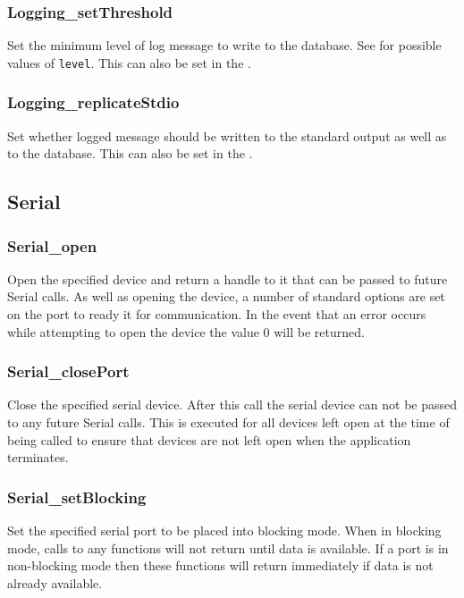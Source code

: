 \subsubsection{Logging\_setThreshold} \label{apiloggingsetthreshold}
 Set the minimum level of log
message to write to the database. See 
for possible values of \texttt{level}. This can also be set in the
. 

\subsubsection{Logging\_replicateStdio} \label{apiloggingreplicate}
 Set whether logged message
should be written to the standard output as well as to the database. This can
also be set in the .


\subsection{Serial} \label{apiserial}
\subsubsection{Serial\_open} \label{apiserialopen}
 Open the specified device
and return a handle to it that can be passed to future Serial calls. As well as
opening the device, a number of standard options are set on the port to ready it
for communication. In the event that an error occurs while attempting to open
the device the value 0 will be returned. 

\subsubsection{Serial\_closePort} \label{apiserialclose}
 Close the specified serial
device. After this call the serial device can not be passed to any future Serial
calls. This is executed for all devices left open at the time of
 being called to ensure that
devices are not left open when the application terminates.

\subsubsection{Serial\_setBlocking} \label{apiserialblocking}
 Set the specified serial port to
be placed into blocking mode. When in blocking mode, calls to any
 functions will not return until data is available. If a port
is in non-blocking mode then these functions will return immediately if data is
not already available.

